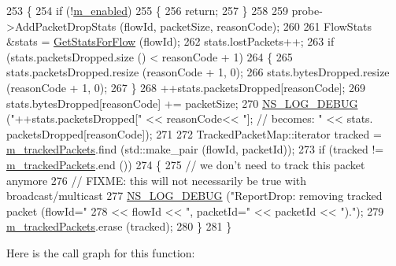 \begin{DoxyCode}
253 \{
254   \textcolor{keywordflow}{if} (!\hyperlink{classns3_1_1FlowMonitor_a26ecae1b883d6625091b07e2698f0d45}{m\_enabled})
255     \{
256       \textcolor{keywordflow}{return};
257     \}
258 
259   probe->AddPacketDropStats (flowId, packetSize, reasonCode);
260 
261   FlowStats &stats = \hyperlink{classns3_1_1FlowMonitor_a029346e25b6b7c0e70fe269e27739a7c}{GetStatsForFlow} (flowId);
262   stats.lostPackets++;
263   \textcolor{keywordflow}{if} (stats.packetsDropped.size () < reasonCode + 1)
264     \{
265       stats.packetsDropped.resize (reasonCode + 1, 0);
266       stats.bytesDropped.resize (reasonCode + 1, 0);
267     \}
268   ++stats.packetsDropped[reasonCode];
269   stats.bytesDropped[reasonCode] += packetSize;
270   \hyperlink{group__logging_ga413f1886406d49f59a6a0a89b77b4d0a}{NS\_LOG\_DEBUG} (\textcolor{stringliteral}{"++stats.packetsDropped["} << reasonCode<< \textcolor{stringliteral}{"]; // becomes: "} << stats.
      packetsDropped[reasonCode]);
271 
272   TrackedPacketMap::iterator tracked = \hyperlink{classns3_1_1FlowMonitor_ab4f63ca5c2a927337870110fa8233bce}{m\_trackedPackets}.find (std::make\_pair (flowId, 
      packetId));
273   \textcolor{keywordflow}{if} (tracked != \hyperlink{classns3_1_1FlowMonitor_ab4f63ca5c2a927337870110fa8233bce}{m\_trackedPackets}.end ())
274     \{
275       \textcolor{comment}{// we don't need to track this packet anymore}
276       \textcolor{comment}{// FIXME: this will not necessarily be true with broadcast/multicast}
277       \hyperlink{group__logging_ga413f1886406d49f59a6a0a89b77b4d0a}{NS\_LOG\_DEBUG} (\textcolor{stringliteral}{"ReportDrop: removing tracked packet (flowId="}
278                     << flowId << \textcolor{stringliteral}{", packetId="} << packetId << \textcolor{stringliteral}{")."});
279       \hyperlink{classns3_1_1FlowMonitor_ab4f63ca5c2a927337870110fa8233bce}{m\_trackedPackets}.erase (tracked);
280     \}
281 \}
\end{DoxyCode}


Here is the call graph for this function\+:


